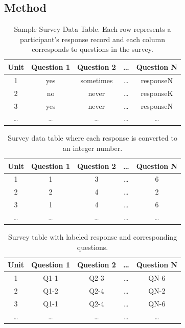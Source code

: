 \subsection{Method}\label{Method}

\begin{table}
    \begin{tabular}[c]{||c c c c c||}
        \hline
        \textbf{Unit} & \textbf{Question 1} & \textbf{Question 2} & \ldots & \textbf{Question N} \\
        \hline\hline
        1 & yes & sometimes & \ldots & responseN \\
        2 & no & never & \ldots & responseK \\
        3 & yes & never & \ldots & responseN \\
        \ldots & \ldots & \ldots & \ldots & \ldots \\
        \hline
    \end{tabular}
    \caption{Sample Survey Data Table. Each row represents a participant's response record and each column corresponds to questions in the survey.}
    \label{tab:table1}
\end{table}

\begin{table}
    \begin{tabular}[c]{||c c c c c||}
        \hline
        \textbf{Unit} & \textbf{Question 1} & \textbf{Question 2} & \ldots & \textbf{Question N} \\
        \hline\hline
        1 & 1 & 3 & \ldots & 6 \\
        2 & 2 & 4 & \ldots & 2 \\
        3 & 1 & 4 & \ldots & 6 \\
        \ldots & \ldots & \ldots & \ldots & \ldots \\
        \hline
    \end{tabular}
    \caption{Survey data table where each response is converted to an integer number.}
    \label{tab:table2}
\end{table}

\begin{table}
    \begin{tabular}[c]{||c c c c c||}
        \hline
        \textbf{Unit} & \textbf{Question 1} & \textbf{Question 2} & \ldots & \textbf{Question N} \\
        \hline\hline
        1 & Q1-1 & Q2-3 & \ldots & QN-6 \\
        2 & Q1-2 & Q2-4 & \ldots & QN-2 \\
        3 & Q1-1 & Q2-4 & \ldots & QN-6 \\
        \ldots & \ldots & \ldots & \ldots & \ldots \\
        \hline
    \end{tabular}
    \caption{Survey table with labeled response and corresponding questions.}
    \label{tab:table3}
\end{table}

